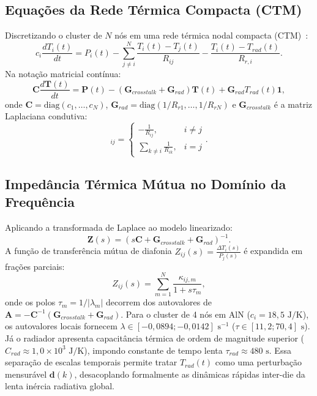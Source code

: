 \documentclass[journal]{IEEEtran}
\begin{document}
\subsection{Equações da Rede Térmica Compacta (CTM)}
Discretizando o cluster de $N$ nós em uma rede térmica nodal compacta (CTM)~\cite{skadron2004hotspot, wang2025packaging, chen2026hotai, nasa2022handbook}:
\begin{equation}
c_i \frac{d T_i(t)}{dt} = P_i(t) - \sum_{j \ne i}^N \frac{T_i(t) - T_j(t)}{R_{ij}} - \frac{T_i(t) - T_{rad}(t)}{R_{r, i}}.
\end{equation}
Na notação matricial contínua:
\begin{equation}
\mathbf{C} \frac{d\mathbf{T}(t)}{dt} = \mathbf{P}(t) - \left( \mathbf{G}_{crosstalk} + \mathbf{G}_{rad} \right) \mathbf{T}(t) + \mathbf{G}_{rad} T_{rad}(t) \mathbf{1},
\end{equation}
onde $\mathbf{C} = \text{diag}(c_1, \dots, c_N)$, $\mathbf{G}_{rad} = \text{diag}(1/R_{r1}, \dots, 1/R_{rN})$ e $\mathbf{G}_{crosstalk}$ é a matriz Laplaciana condutiva:
\begin{equation}
[\mathbf{G}_{crosstalk}]_{ij} = \begin{cases} - \frac{1}{R_{ij}}, & i \ne j \\ \sum_{k \ne i} \frac{1}{R_{ik}}, & i = j \end{cases}.
\end{equation}

\subsection{Impedância Térmica Mútua no Domínio da Frequência}
Aplicando a transformada de Laplace ao modelo linearizado:
\begin{equation}
\mathbf{Z}(s) = \left( s \mathbf{C} + \mathbf{G}_{crosstalk} + \mathbf{G}_{rad} \right)^{-1}.
\end{equation}
A função de transferência mútua de diafonia $Z_{ij}(s) = \frac{\Delta T_i(s)}{P_j(s)}$ é expandida em frações parciais:
\begin{equation}
Z_{ij}(s) = \sum_{m=1}^{N} \frac{\kappa_{ij, m}}{1 + s \tau_m},
\end{equation}
onde os polos $\tau_m = 1/|\lambda_m|$ decorrem dos autovalores de $\mathbf{A} = -\mathbf{C}^{-1}(\mathbf{G}_{crosstalk} + \mathbf{G}_{rad})$. Para o cluster de 4 nós em AlN ($c_i = 18{,}5\text{ J/K}$), os autovalores locais fornecem $\lambda \in [-0{,}0894; -0{,}0142]\text{ s}^{-1}$ ($\tau \in [11{,}2; 70{,}4]\text{ s}$). Já o radiador apresenta capacitância térmica de ordem de magnitude superior ($C_{rad} \approx 1{,}0 \times 10^3\text{ J/K}$), impondo constante de tempo lenta $\tau_{rad} \approx 480\text{ s}$. Essa separação de escalas temporais permite tratar $T_{rad}(t)$ como uma perturbação mensurável $\mathbf{d}(k)$, desacoplando formalmente as dinâmicas rápidas inter-die da lenta inércia radiativa global.
\end{document}
